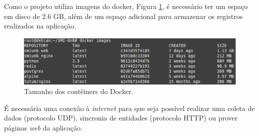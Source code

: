     Como o projeto utiliza imagens do docker, Figura \ref{docker_size}, é necessário ter um espaço em disco de 2.6 GB, além de um espaço adicional para armazenar os registros realizados na aplicação.

    \begin{figure}[!h]
        \centering
        \includegraphics[keepaspectratio=true,scale=0.55]{figuras/docker_size.eps}
        \caption{Tamanho dos contêiners do Docker.}
        \label{docker_size}
    \end{figure}

    É necessária uma conexão à \textit{internet} para que seja possível realizar uma coleta de dados (protocolo UDP), sincronia de entidades (protocolo HTTP) ou prover páginas \textit{web} da aplicação.